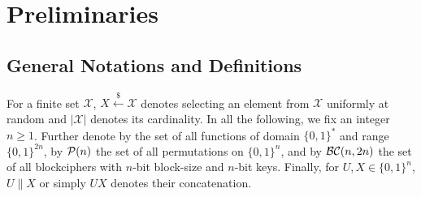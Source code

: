 

\section{Preliminaries}
\label{section:preliminary}


\subsection{General Notations and Definitions}

For a finite set $\mathcal{X}$, $X \xleftarrow{\$} \mathcal{X}$ denotes selecting an element from $\mathcal{X}$ uniformly at random and $|\mathcal{X}|$ denotes its cardinality.
In all the following, we fix an integer $n\geq 1$.
Further denote by  the set of all
functions of domain $\{0,1\}^*$ and range $\{0,1\}^{2n}$,
by $\mathcal{P}(n)$ the set of all
permutations on $\{0,1\}^n$, and by
$\mathcal{BC}(n,2n)$ the set of all blockciphers with $n$-bit
block-size and $n$-bit keys. Finally, for $U,X\in\{0,1\}^n$, $U\|X$ or simply $UX$ denotes their concatenation.
